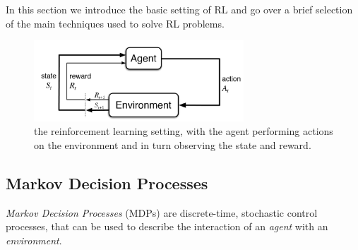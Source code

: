 In this section we introduce the basic setting of RL and go over a brief 
selection of the main techniques used to solve RL problems. 
%
\begin{figure}[h]
\includegraphics[width=0.7\textwidth]{pictures/reinforcement}
\centering
\caption{the reinforcement learning setting, with the agent performing actions
	 on the environment and in turn observing the state and reward.}
\end{figure}
%

\subsection{Markov Decision Processes}
\textit{Markov Decision Processes} (MDPs) are discrete-time, stochastic control 
processes, that can be used to describe the interaction of an \textit{agent} 
with an \textit{environment}.

